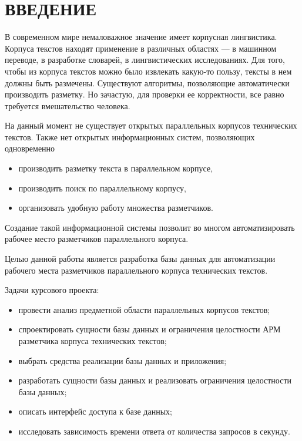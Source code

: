 \section*{ВВЕДЕНИЕ}

В современном мире немаловажное значение имеет корпусная лингвистика.
Корпуса текстов находят применение в различных областях --- в машинном переводе, в разработке словарей, в лингвистических исследованиях.
Для того, чтобы из корпуса текстов можно было извлекать какую-то пользу, тексты в нем должны быть размечены.
Существуют алгоритмы, позволяющие автоматически производить разметку.
Но зачастую, для проверки ее корректности, все равно требуется вмешательство человека.

На данный момент не существует открытых параллельных корпусов технических текстов.
Также нет открытых информационных систем, позволяющих одновременно
\begin{itemize}
    \item производить разметку текста в параллельном корпусе,
    \item производить поиск по параллельному корпусу,
    \item организовать удобную работу множества разметчиков.
\end{itemize}

Создание такой информационной системы позволит во многом автоматизировать рабочее место разметчиков параллельного корпуса.

Целью данной работы является разработка базы данных для автоматизации рабочего места разметчиков параллельного корпуса технических текстов.

Задачи курсового проекта:
\begin{itemize}
    \item провести анализ предметной области параллельных корпусов текстов;
    \item спроектировать сущности базы данных и ограничения целостности АРМ разметчика корпуса технических текстов;
    \item выбрать средства реализации базы данных и приложения;
    \item разработать сущности базы данных и реализовать ограничения целостности базы данных;
    \item описать интерфейс доступа к базе данных;
    \item исследовать зависимость времени ответа от количества запросов в секунду.
\end{itemize}
